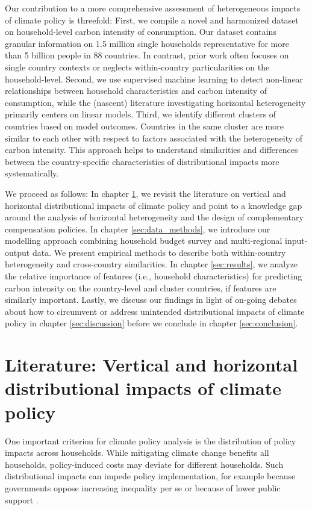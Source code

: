 \documentclass[12pt, a4paper]{article}
\begin{document}
Our contribution to a more comprehensive assessment of heterogeneous impacts of climate policy is threefold: First, we compile a novel and harmonized dataset on household-level carbon intensity of consumption. Our dataset contains granular information on 1.5 million single households representative for more than 5 billion people in 88 countries. In contrast, prior work often focuses on single country contexts or neglects within-country particularities on the household-level. Second, we use supervised machine learning to detect non-linear relationships between household characteristics and carbon intensity of consumption, while the (nascent) literature investigating horizontal heterogeneity primarily centers on linear models. Third, we identify different clusters of countries based on model outcomes. Countries in the same cluster are more similar to each other with respect to factors associated with the heterogeneity of carbon intensity. This approach helps to understand similarities and differences between the country-specific characteristics of distributional impacts more systematically. %

We proceed as follows: In chapter \ref{sec:literature}, we revisit the literature on vertical and horizontal distributional impacts of climate policy and point to a knowledge gap around the analysis of horizontal heterogeneity and the design of complementary compensation policies. In chapter \ref{sec:data_methods}, we introduce our modelling approach combining household budget survey and multi-regional input-output data. We present empirical methods to describe both within-country heterogeneity and cross-country similarities. In chapter \ref{sec:results}, we analyze the relative importance of features (i.e., household characteristics) for predicting carbon intensity on the country-level and cluster countries, if features are similarly important. Lastly, we discuss our findings in light of on-going debates about how to circumvent or address unintended distributional impacts of climate policy in chapter \ref{sec:discussion} before we conclude in chapter \ref{sec:conclusion}.  

\section{Literature: Vertical and horizontal distributional impacts of climate policy} \label{sec:literature}

One important criterion for climate policy analysis is the distribution of policy impacts across households. While mitigating climate change benefits all households, policy-induced costs may deviate for different households. Such distributional impacts can impede policy implementation, for example because governments oppose increasing inequality per se or because of lower public support \autocite{Bergquist.2022,Douenne.2022}. 
\end{document}
